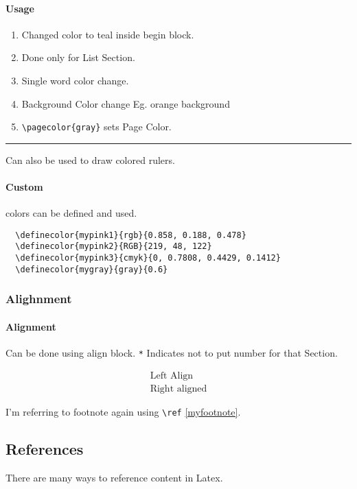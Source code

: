 \documentclass{report}[a4paper,12pt] %
\begin{document}
\paragraph{Usage}
\begin{enumerate}
  \color{teal}
  \item Changed color to teal inside begin block.
  \item Done only for List Section.
  \item Single \textcolor{Sepia}{word} color change.
  \item Background Color change Eg. \colorbox{BurntOrange}{orange background}
  \item \verb|\pagecolor{gray}| sets Page Color.
\end{enumerate}

{\color{RubineRed} \rule{\linewidth}{0.5mm}}
Can also be used to draw colored rulers. 

\paragraph{Custom} colors can be defined and \textcolor{mypink2}{used}.

\begin{verbatim}
  \definecolor{mypink1}{rgb}{0.858, 0.188, 0.478}
  \definecolor{mypink2}{RGB}{219, 48, 122}
  \definecolor{mypink3}{cmyk}{0, 0.7808, 0.4429, 0.1412}
  \definecolor{mygray}{gray}{0.6}
\end{verbatim}

\subsubsection{Alighnment}
\paragraph{Alignment} Can be done using align block. 
\verb|*| Indicates not to put number for that Section.

\begin{align*}
  \text{Left Align}\\
  \text{Right aligned}
\end{align*}

I'm referring to footnote again using \verb|\ref| \ref{myfootnote}.

\subsection{References}
There are many ways to reference content in Latex.
\end{document}
